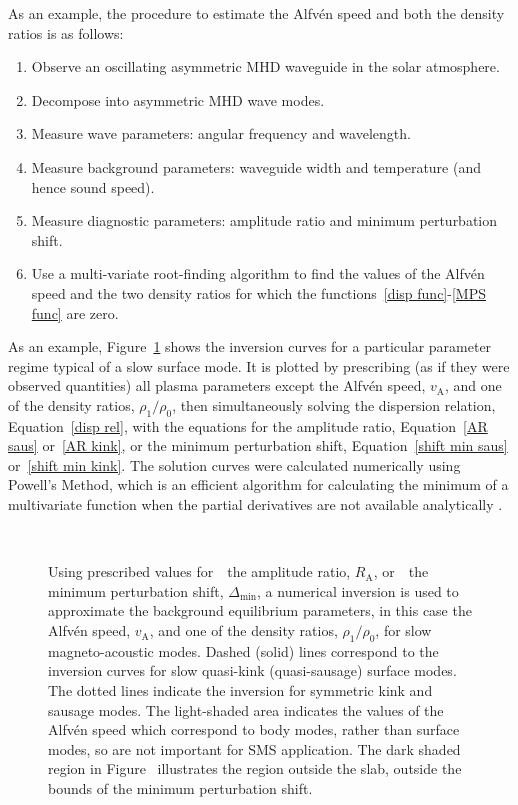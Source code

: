 As an example, the procedure to estimate the Alfv\'{e}n speed and both the density ratios is as follows:
\begin{enumerate}
	\item Observe an oscillating asymmetric MHD waveguide in the solar atmosphere.
	\item Decompose into asymmetric MHD wave modes.
	\item Measure wave parameters: angular frequency and wavelength.
	\item Measure background parameters: waveguide width and temperature (and hence sound speed).
	\item Measure diagnostic parameters: amplitude ratio and minimum perturbation shift.
	\item Use a multi-variate root-finding algorithm to find the values of the Alfv\'{e}n speed and the two density ratios for which the functions~\eqref{disp func}-\eqref{MPS func} are zero.
\end{enumerate}

As an example, Figure~\ref{fig: vA approx} shows the inversion curves for a particular parameter regime typical of a slow surface mode. It is plotted by prescribing (as if they were observed quantities) all plasma parameters except the Alfv\'{e}n speed, $v_\textrm{A}$, and one of the density ratios, $\rho_1/\rho_0$, then simultaneously solving the dispersion relation, Equation~\eqref{disp rel}, with the equations for the amplitude ratio, Equation~\eqref{AR saus} or~\eqref{AR kink}, or the minimum perturbation shift, Equation~\eqref{shift min saus} or~\eqref{shift min kink}. The solution curves were calculated numerically using Powell's Method, which is an efficient algorithm for calculating the minimum of a multivariate function when the partial derivatives are not available analytically \citep{pow64}.

\begin{figure}
	\centering
	 \\
	\caption{Using prescribed values for~\protect{}~the amplitude ratio, $R_\textrm{A}$, or~\protect{}~the minimum perturbation shift, $\Delta_\textrm{min}$, a numerical inversion is used to approximate the background equilibrium parameters, in this case the Alfv\'{e}n speed, $v_\textrm{A}$, and one of the density ratios, $\rho_1 / \rho_0$, for slow magneto-acoustic modes. Dashed (solid) lines correspond to the inversion curves for slow quasi-kink (quasi-sausage) surface modes. The dotted lines indicate the inversion for symmetric kink and sausage modes. The light-shaded area indicates the values of the Alfv\'{e}n speed which correspond to body modes, rather than surface modes, so are not important for SMS application. The dark shaded region in Figure~\protect{} illustrates the region outside the slab, outside the bounds of the minimum perturbation shift.}
	\label{fig: vA approx}
\end{figure}

